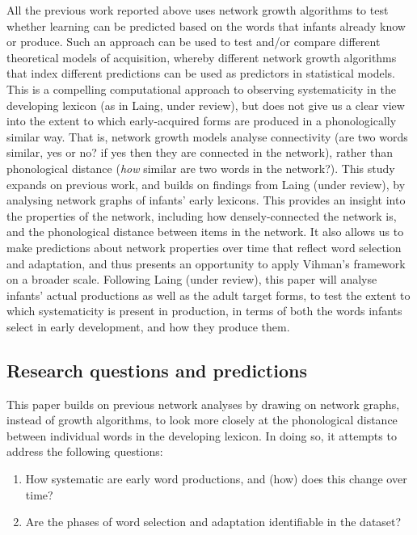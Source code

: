 \documentclass[
  man]{apa6}
\providecommand{\tightlist}{%
  \setlength{\itemsep}{0pt}\setlength{\parskip}{0pt}}
\begin{document}
All the previous work reported above uses network growth algorithms to test whether learning can be predicted based on the words that infants already know or produce. Such an approach can be used to test and/or compare different theoretical models of acquisition, whereby different network growth algorithms that index different predictions can be used as predictors in statistical models. This is a compelling computational approach to observing systematicity in the developing lexicon (as in Laing, under review), but does not give us a clear view into the extent to which early-acquired forms are produced in a phonologically similar way. That is, network growth models analyse connectivity (are two words similar, yes or no? if yes then they are connected in the network), rather than phonological distance (\emph{how} similar are two words in the network?). This study expands on previous work, and builds on findings from Laing (under review), by analysing network graphs of infants' early lexicons. This provides an insight into the properties of the network, including how densely-connected the network is, and the phonological distance between items in the network. It also allows us to make predictions about network properties over time that reflect word selection and adaptation, and thus presents an opportunity to apply Vihman's framework on a broader scale. Following Laing (under review), this paper will analyse infants' actual productions as well as the adult target forms, to test the extent to which systematicity is present in production, in terms of both the words infants select in early development, and how they produce them.

\hypertarget{research-questions-and-predictions}{%
\subsection{Research questions and predictions}\label{research-questions-and-predictions}}

This paper builds on previous network analyses by drawing on network graphs, instead of growth algorithms, to look more closely at the phonological distance between individual words in the developing lexicon. In doing so, it attempts to address the following questions:

\begin{enumerate}
\def\labelenumi{\arabic{enumi}.}
\tightlist
\item
  How systematic are early word productions, and (how) does this change over time?
\item
  Are the phases of word selection and adaptation identifiable in the dataset?
\end{enumerate}
\end{document}
